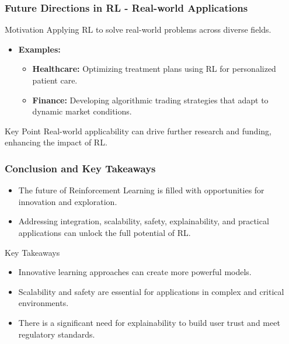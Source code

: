 \documentclass[aspectratio=169]{beamer}
\begin{document}
\begin{frame}[fragile]
    \frametitle{Future Directions in RL - Real-world Applications}
    \begin{block}{Motivation}
        Applying RL to solve real-world problems across diverse fields.
    \end{block}
    \begin{itemize}
        \item \textbf{Examples:}
            \begin{itemize}
                \item \textbf{Healthcare:} Optimizing treatment plans using RL for personalized patient care.
                \item \textbf{Finance:} Developing algorithmic trading strategies that adapt to dynamic market conditions.
            \end{itemize}
    \end{itemize}
    \begin{block}{Key Point}
        Real-world applicability can drive further research and funding, enhancing the impact of RL.
    \end{block}
\end{frame}

\begin{frame}[fragile]
    \frametitle{Conclusion and Key Takeaways}
    \begin{itemize}
        \item The future of Reinforcement Learning is filled with opportunities for innovation and exploration.
        \item Addressing integration, scalability, safety, explainability, and practical applications can unlock the full potential of RL.
    \end{itemize}
    \begin{block}{Key Takeaways}
        \begin{itemize}
            \item Innovative learning approaches can create more powerful models.
            \item Scalability and safety are essential for applications in complex and critical environments.
            \item There is a significant need for explainability to build user trust and meet regulatory standards.
        \end{itemize}
    \end{block}
\end{frame}
\end{document}
